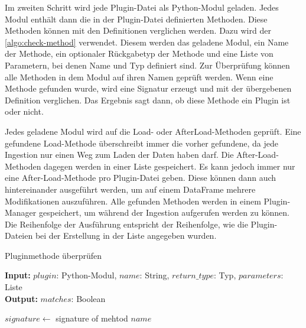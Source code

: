 Im zweiten Schritt wird jede Plugin-Datei als Python-Modul geladen.
Jedes Modul enthält dann die in der Plugin-Datei definierten Methoden.
Diese Methoden können mit den Definitionen verglichen werden.
Dazu wird der \cref{algo:check-method} verwendet.
Diesem werden das geladene Modul, ein Name der Methode, ein optionaler Rückgabetyp der Methode und eine Liste von Parametern, bei denen Name und Typ definiert sind.
Zur Überprüfung können alle Methoden in dem Modul auf ihren Namen geprüft werden.
Wenn eine Methode gefunden wurde, wird eine Signatur erzeugt und mit der übergebenen Definition verglichen.
Das Ergebnis sagt dann, ob diese Methode ein Plugin ist oder nicht.

Jedes geladene Modul wird auf die Load- oder AfterLoad-Methoden geprüft.
Eine gefundene Load-Methode überschreibt immer die vorher gefundene, da jede Ingestion nur einen Weg zum Laden der Daten haben darf.
Die After-Load-Methoden dagegen werden in einer Liste gespeichert.
Es kann jedoch immer nur eine After-Load-Methode pro Plugin-Datei geben.
Diese können dann auch hintereinander ausgeführt werden, um auf einem DataFrame mehrere Modifikationen auszuführen.
Alle gefunden Methoden werden in einem Plugin-Manager gespeichert, um während der Ingestion aufgerufen werden zu können.
Die Reihenfolge der Ausführung entspricht der Reihenfolge, wie die Plugin-Dateien bei der Erstellung in der Liste angegeben wurden.

\begin{algorithm}
    \caption{Pluginmethode überprüfen}
    \label{algo:check-method}

    \textbf{Input:} $plugin$: Python-Modul, $name$: String, $return\_type$: Typ, $parameters$: Liste \\
    \textbf{Output:} $matches$: Boolean \\


    $signature \gets$ signature of mehtod $name$



\end{algorithm}

